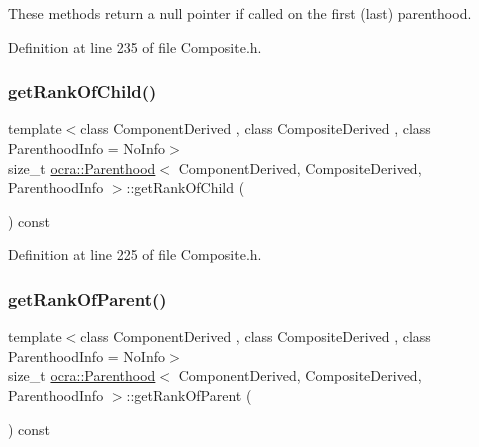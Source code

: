 These methods return a null pointer if called on the first (last) parenthood. 

Definition at line 235 of file Composite.\+h.

\hypertarget{classocra_1_1Parenthood_a51674187858154add6b9ca7d14110613}{}\label{classocra_1_1Parenthood_a51674187858154add6b9ca7d14110613} 
\subsubsection{\texorpdfstring{get\+Rank\+Of\+Child()}{getRankOfChild()}}
{\footnotesize\ttfamily template$<$class Component\+Derived , class Composite\+Derived , class Parenthood\+Info  = No\+Info$>$ \\
size\+\_\+t \hyperlink{classocra_1_1Parenthood}{ocra\+::\+Parenthood}$<$ Component\+Derived, Composite\+Derived, Parenthood\+Info $>$\+::get\+Rank\+Of\+Child (\begin{DoxyParamCaption}{ }\end{DoxyParamCaption}) const\hspace{0.3cm}{\ttfamily [inline]}}



Definition at line 225 of file Composite.\+h.

\hypertarget{classocra_1_1Parenthood_a82bb7a676d20350435a07b710de57052}{}\label{classocra_1_1Parenthood_a82bb7a676d20350435a07b710de57052} 
\subsubsection{\texorpdfstring{get\+Rank\+Of\+Parent()}{getRankOfParent()}}
{\footnotesize\ttfamily template$<$class Component\+Derived , class Composite\+Derived , class Parenthood\+Info  = No\+Info$>$ \\
size\+\_\+t \hyperlink{classocra_1_1Parenthood}{ocra\+::\+Parenthood}$<$ Component\+Derived, Composite\+Derived, Parenthood\+Info $>$\+::get\+Rank\+Of\+Parent (\begin{DoxyParamCaption}{ }\end{DoxyParamCaption}) const\hspace{0.3cm}{\ttfamily [inline]}}



